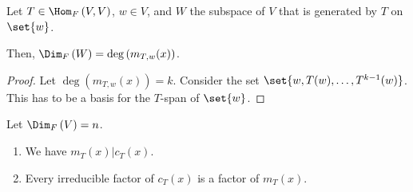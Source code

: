 \documentclass[10pt]{mypackage}
\begin{document}
\begin{lemma}
  Let $T\in \Hom_{F}\left(V,V\right)$, $w\in V$, and $W$ the subspace of $V$ that is generated by $T$ on $\set{w}$.\newline

  Then, $\Dim_{F}\left(W\right) = \deg\left(m_{T,w}(x)\right)$.
\end{lemma}
\begin{proof}
  Let $\deg\left(m_{T,w}(x)\right) = k$. Consider the set $\set{w,T(w),\dots,T^{k-1}(w)}$. This has to be a basis for the $T$-span of $\set{w}$.
\end{proof}
\begin{theorem}
  Let $\Dim_{F}\left(V\right) = n$.
  \begin{enumerate}[(1)]
    \item We have $m_{T}(x)|c_{T}(x)$.
    \item Every irreducible factor of $c_T(x)$ is a factor of $m_{T}(x)$.
  \end{enumerate}
\end{theorem}
\end{document}
